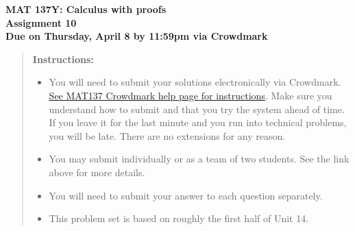 \documentclass[12pt]{exam}
\begin{document}
{\large
	\begin{center}
		{\bf MAT 137Y: Calculus with proofs}\\
		{\bf Assignment 10} \\
		{\bf Due on Thursday, April 8 by 11:59pm via Crowdmark}
	\end{center}
}

\begin{quotation}
{\bf Instructions:}
	\begin{itemize}
		\item	 You will need to submit your solutions electronically via Crowdmark.   \href{https://www.math.toronto.edu/~alfonso/137/PS/137_CM.html}{See MAT137 Crowdmark help page for instructions}.  Make sure you understand how to submit and that you try the system ahead of time.  If you leave it for the last minute and you run into technical problems, you will be late.  There are no extensions for any reason.
		\item You may submit individually or as a team of two students.  See the link above for more details.
		\item  You will need to submit your answer to each question separately.
		\item  This problem set is based on roughly the first half of Unit 14.
	\end{itemize}
\end{quotation}
\end{document}
